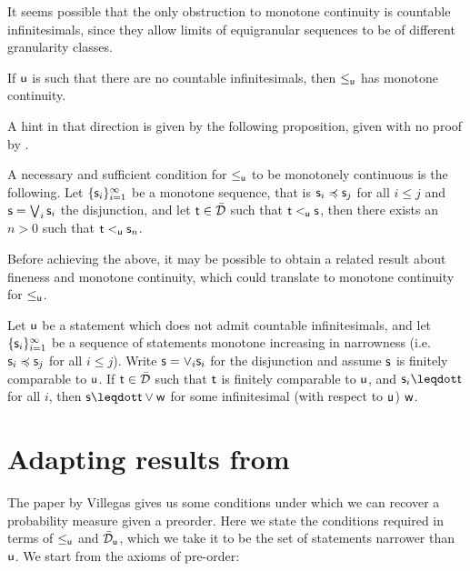 \documentclass[10pt, onecolumn, longbibliography, nofootinbib]{revtex4-2}
\begin{document}
It seems possible that the only obstruction to monotone continuity is countable infinitesimals, since they allow limits of equigranular sequences to be of different granularity classes. 

\begin{desid}
    If $\stmt[u]$ is such that there are no countable infinitesimals, then $\lequ$ has monotone continuity. 
\end{desid}

A hint in that direction is given by the following proposition, given with no proof by \cite{villegas}.

\begin{prop}
	A necessary and sufficient condition for $\lequ$ to be monotonely continuous is the following. Let  $\{\stmt_i\}_{i=1}^{\infty}$ be a monotone sequence, that is $\stmt_i \narrower \stmt_j$ for all $i \leq j$ and $\stmt = \bigOR_i\stmt_i$ the disjunction, and let $\stmt[t] \in \tdomain$ such that $\stmt[t] \ltu \stmt$, then there exists an $n > 0$ such that $\stmt[t] \ltu \stmt_n$.
\end{prop}

Before achieving the above, it may be possible to obtain a related result about fineness and monotone continuity, which could translate to monotone continuity for $\lequ$. 

\begin{desid}
Let $\stmt[u]$ be a statement which does not admit countable infinitesimals, and let $\{\stmt_i\}_{i=1}^{\infty}$ be a sequence of statements monotone increasing in narrowness (i.e. $\stmt_i\narrower\stmt_j$ for all $i\leq j$). Write $\stmt=\OR_i\stmt_i$ for the disjunction and assume $\stmt$ is finitely comparable to $\stmt[u]$. If $\stmt[t]\in\tdomain$ such that $\stmt[t]$ is finitely comparable to $\stmt[u]$, and $\stmt_i\finer\stmt[t]$ for all $i$, then $\stmt\finer\stmt[t]\OR\stmt[w]$ for some infinitesimal (with respect to $\stmt[u]$) $\stmt[w]$. 
\end{desid}

\section{Adapting results from \cite{villegas}}

The paper \cite{villegas} by Villegas gives us some conditions under which we can recover a probability measure given a preorder. Here we state the conditions required in terms of $\lequ$ and $\tdomain_{\stmt[u]}$, which we take it to be the set of statements narrower than $\stmt[u]$. We start from the axioms of pre-order:
\end{document}
